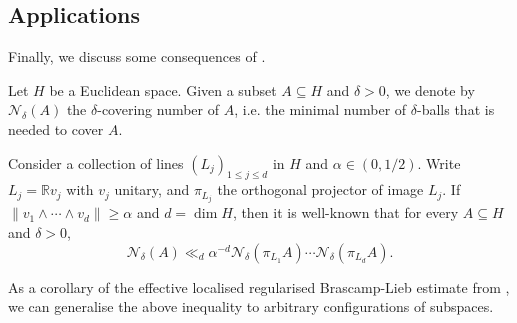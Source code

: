 \documentclass[a4paper,english]{amsart}
\theoremstyle{definition}
\newcommand{\R}{\mathbb{R}}
\newcommand{\1}{\mathbbm{1}}
\newcommand{\bbf}{{\bf{f}}}
\newcommand{\bbR}{{\bf{R}}}
\newcommand{\cN} {{\mathcal N}}
\newcommand{\sD} {{\mathscr D}}
\newcommand{\norm}[1]{\lVert#1\rVert}   %
\DeclareMathOperator{\BL}{BL}
\DeclareMathOperator{\leb}{leb}
\begin{document}
\bigskip

\subsection{Applications} \label{Sec-appli}
Finally, we discuss some consequences of .

\bigskip
{}
Let $H$ be a Euclidean space.
Given a subset $A \subseteq H$ and $\delta>0$, we denote by $\cN_\delta(A)$ the $\delta$-covering number of $A$, i.e. the minimal number of $\delta$-balls that is needed to cover $A$.

Consider a collection of lines $(L_{j})_{1 \leq j \leq d}$ in $H$ and $\alpha\in (0, 1/2)$. Write $L_{j}=\R v_{j}$ with $v_{j}$ unitary, and  $\pi_{L_{j}}$  the orthogonal projector of image $L_{j}$.
If $\norm{v_{1} \wedge \dotsm \wedge v_{d}} \geq \alpha$ and $ d=\dim H $, then it is well-known that for every $A\subseteq H$ and $\delta>0$,
\begin{equation} \label{visual-ineq0}
\cN_{\delta}(A)\ll_d \alpha^{-d} \cN_{\delta}(\pi_{L_{1}}A) \dotsm \cN_{\delta}(\pi_{L_{d}}A).
\end{equation}

As a corollary of the effective localised regularised Brascamp-Lieb estimate from , we can generalise the above inequality to arbitrary configurations of subspaces.
\end{document}
